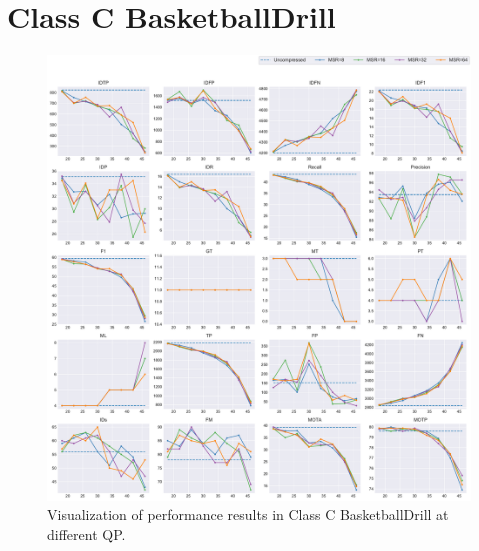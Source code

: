 
\section{Class C BasketballDrill}
\label{sec:appendix/BasketballDrill_all}


\begin{figure}[!htbp]
\centering
\includegraphics[width=1.0\linewidth]{img/appendix/BasketballDrill_all_multiplots_qp.pdf}
\caption[Visualization of performance results in Class C BasketballDrill at different QP]
{Visualization of performance results in Class C BasketballDrill at different QP.}
\label{fig:BasketballDrill_all_qp}
\end{figure}


